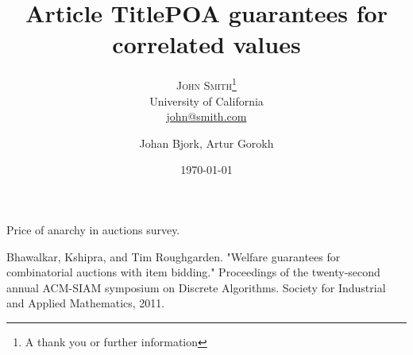 \documentclass[twoside,onecolumn]{article}
\title{Article Title} %
\author{%
\textsc{John Smith}\thanks{A thank you or further information} \\[1ex] %
\normalsize University of California \\ %
\normalsize \href{mailto:john@smith.com}{john@smith.com} %
}
\date{\today} %
\author{Johan Bjork, Artur Gorokh}
\begin{document}
\title{POA guarantees for correlated values
}
\maketitle







%
%
\begin{thebibliography}{9}
Price of anarchy in auctions survey.
 
 Bhawalkar, Kshipra, and Tim Roughgarden. "Welfare guarantees for combinatorial auctions with item bidding." Proceedings of the twenty-second annual ACM-SIAM symposium on Discrete Algorithms. Society for Industrial and Applied Mathematics, 2011.
 
\end{thebibliography}
\end{document}
